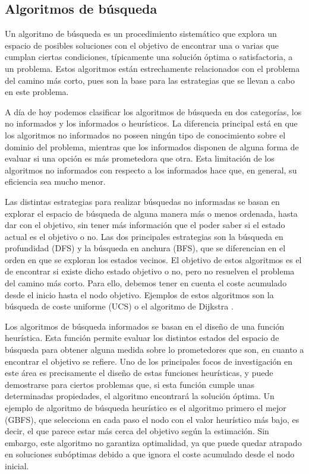 \documentclass[a4paper,12pt]{article}
\begin{document}


\subsection{Algoritmos de búsqueda}\label{sec:alg-busqueda}

Un algoritmo de búsqueda es un procedimiento sistemático que explora un espacio de posibles soluciones con el objetivo de encontrar una o varias que cumplan ciertas condiciones, típicamente una solución óptima o satisfactoria, a un problema. Estos algoritmos están estrechamente relacionados con el problema del camino más corto, pues son la base para las estrategias que se llevan a cabo en este problema. 

A día de hoy podemos clasificar los algoritmos de búsqueda en dos categorías, los no informados y los informados o heurísticos. La diferencia principal está en que los algoritmos no informados no poseen ningún tipo de conocimiento sobre el dominio del problema, mientras que los informados disponen de alguna forma de evaluar si una opción es más prometedora que otra. Esta limitación de los algoritmos no informados con respecto a los informados hace que, en general, su eficiencia sea mucho menor.

Las distintas estrategias para realizar búsquedas no informadas se basan en explorar el espacio de búsqueda de alguna manera más o menos ordenada, hasta dar con el objetivo, sin tener más información que el poder saber si el estado actual es el objetivo o no. Las dos principales estrategias son la búsqueda en profundidad (DFS) y la búsqueda en anchura (BFS), que se diferencian en el orden en que se exploran los estados vecinos. El objetivo de estos algoritmos es el de encontrar si existe dicho estado objetivo o no, pero no resuelven el problema del camino más corto. Para ello, debemos tener en cuenta el coste acumulado desde el inicio hasta el nodo objetivo. Ejemplos de estos algoritmos son la búsqueda de coste uniforme (UCS) o el algoritmo de Dijkstra \cite{dijkstra_note_1959}.

Los algoritmos de búsqueda informados se basan en el diseño de una función heurística. Esta función permite evaluar los distintos estados del espacio de búsqueda para obtener alguna medida sobre lo prometedores que son, en cuanto a encontrar el objetivo se refiere. Uno de los principales focos de investigación en este área es precisamente el diseño de estas funciones heurísticas, y puede demostrarse para ciertos problemas que, si esta función cumple unas determinadas propiedades, el algoritmo encontrará la solución óptima. Un ejemplo de algoritmo de búsqueda heurístico es el algoritmo primero el mejor (GBFS), que selecciona en cada paso el nodo con el valor heurístico más bajo, es decir, el que parece estar más cerca del objetivo según la estimación. Sin embargo, este algoritmo no garantiza optimalidad, ya que puede quedar atrapado en soluciones subóptimas debido a que ignora el coste acumulado desde el nodo inicial.
\end{document}

